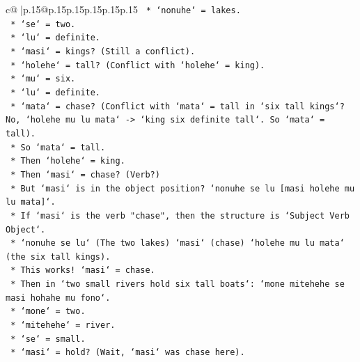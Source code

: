 \documentclass{article}
\begin{document}
{\begin{supertabular}{c@{$\;$}|p{.15\linewidth}@{}p{.15\linewidth}p{.15\linewidth}p{.15\linewidth}p{.15\linewidth}p{.15\linewidth}}
{{{\texttt{                                    *   `nonuhe` = lakes.} \\
\texttt{                                    *   `se` = two.} \\
\texttt{                                    *   `lu` = definite.} \\
\texttt{                                    *   `masi` = kings? (Still a conflict).} \\
\texttt{                                    *   `holehe` = tall? (Conflict with `holehe` = king).} \\
\texttt{                                    *   `mu` = six.} \\
\texttt{                                    *   `lu` = definite.} \\
\texttt{                                    *   `mata` = chase? (Conflict with `mata` = tall in `six tall kings`? No, `holehe mu lu mata` {-}> `king six definite tall`. So `mata` = tall).} \\
\texttt{                                    *   So `mata` = tall.} \\
\texttt{                                    *   Then `holehe` = king.} \\
\texttt{                                    *   Then `masi` = chase? (Verb?)} \\
\texttt{                                    *   But `masi` is in the object position? `nonuhe se lu {[}masi holehe mu lu mata{]}`.} \\
\texttt{                                    *   If `masi` is the verb "chase", then the structure is `Subject Verb Object`.} \\
\texttt{                                    *   `nonuhe se lu` (The two lakes) `masi` (chase) `holehe mu lu mata` (the six tall kings).} \\
\texttt{                                    *   This works! `masi` = chase.} \\
\texttt{                                    *   Then in `two small rivers hold six tall boats`: `mone mitehehe se masi hohahe mu fono`.} \\
\texttt{                                        *   `mone` = two.} \\
\texttt{                                        *   `mitehehe` = river.} \\
\texttt{                                        *   `se` = small.} \\
\texttt{                                        *   `masi` = hold? (Wait, `masi` was chase here).} \\
}}}
\end{supertabular}}
\end{document}
